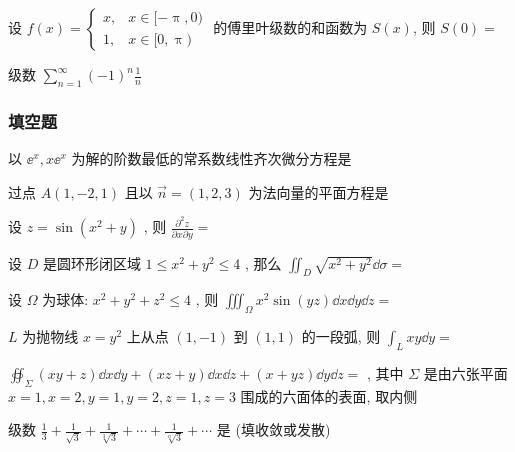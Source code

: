 \begin{ti}
	设 $f(x)=\begin{cases}
		x, & x\in[-\uppi,0)\\
		1, & x\in[0,\uppi)
	\end{cases}$ 的傅里叶级数的和函数为 $S(x)$, 则 $S(0)=$ \kuo
\end{ti}

\begin{ti}
	级数 $\sum_{n=1}^{\infty}(-1)^{n} \frac{1}{n}$ \kuo
\end{ti}

\subsubsection{填空题}
\begin{ti}
	以 $\ee^x,x\ee^x$ 为解的阶数最低的常系数线性齐次微分方程是 \hua{}
\end{ti}

\begin{ti}
	过点 $A(1,-2,1)$ 且以 $\vec{n}=(1,2,3)$ 为法向量的平面方程是 \hua{}
\end{ti}

\begin{ti}
	设 $z=\sin \left(x^{2}+y\right)$ , 则 $\frac{\partial^{2} z}{\partial x \partial y}=$ \hua{}
\end{ti}

\begin{ti}
	设 $D$ 是圆环形闭区域 $1 \leqslant x^{2}+y^{2} \leqslant 4$ , 那么 $\iint_{D} \sqrt{x^{2}+y^{2}} \dd{\sigma}=$ \hua{}
\end{ti}

\begin{ti}
	设 $\Omega$ 为球体: $x^{2}+y^{2}+z^{2} \leqslant 4$ , 则 $\iiint_{\Omega} x^{2} \sin (y z) \dd{x} \dd{y} \dd{z}=$ \hua{}
\end{ti}

\begin{ti}
	$L$ 为抛物线 $x=y^2$ 上从点 $(1,-1)$ 到 $(1,1)$ 的一段弧, 则 $\int_{L} x y \dd{y}=$ \hua{}
\end{ti}

\begin{ti}
	$\oiint_{\Sigma}(x y+z) \dd{x} \dd{y}+(x z+y) \dd{x} \dd{z}+(x+y z) \dd{y} \dd{z}=$ \hua{}, 其中 $\Sigma$ 是由六张平面 $x=1,x=2,y=1,y=2,z=1,z=3$ 围成的六面体的表面, 取内侧
\end{ti}

\begin{ti}
	级数 $\frac{1}{3}+\frac{1}{\sqrt{3}}+\frac{1}{\sqrt[3]{3}}+\cdots+\frac{1}{\sqrt[n]{3}}+\cdots$ 是 \hua{}(填收敛或发散)
\end{ti}

